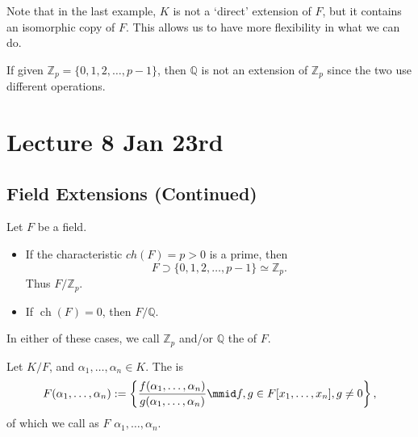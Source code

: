 \documentclass[notoc,notitlepage,nobib]{tufte-book}
\DeclareMathOperator{\ch}{ch}
\begin{document}
\begin{note}
  Note that in the last example, $K$ is not a `direct' extension of $F$, but it contains an isomorphic
  copy of $F$. This allows us to have more flexibility in what we can do.
\end{note}

\begin{warning}
  If given $\mathbb{Z}_p = \{ 0, 1, 2, \ldots, p - 1 \}$, then $\mathbb{Q}$ is not an extension of
  $\mathbb{Z}_p$ since the two use different operations.
\end{warning}



\chapter{Lecture 8 Jan 23rd}%
\label{chp:lecture_8_jan_23rd}

\section{Field Extensions (Continued)}%
\label{sec:field_extensions_continued}

\begin{eg}
  Let $F$ be a field.
  \begin{itemize}
    \item If the characteristic $ch(F) = p > 0$ is a prime, then 
      \begin{equation*}
        F \supset \{ 0, 1, 2, \ldots, p - 1 \} \simeq \mathbb{Z}_p.
      \end{equation*}
      Thus $F / \mathbb{Z}_p$.
    \item If $\ch(F) = 0$, then $F / \mathbb{Q}$.
  \end{itemize}
  In either of these cases, we call $\mathbb{Z}_p$ and/or $\mathbb{Q}$ the  of
  $F$.
\end{eg}

\begin{defn}\label{defn:generated_field_extension}
  Let $K / F$, and $\alpha_1, \ldots, \alpha_n \in K$. The  is
  \begin{equation*}
    F(\alpha_1, \ldots, \alpha_n) 
    := \left\{ \frac{f(\alpha_1, \ldots, \alpha_n)}{g(\alpha_1, \ldots, \alpha_n)} \mmid f, g \in F[x_1, \ldots, x_n], g \neq 0 \right\},
  \end{equation*}
  of which we call as $F$  $\alpha_1, \ldots, \alpha_n$.
\end{defn}
\end{document}
